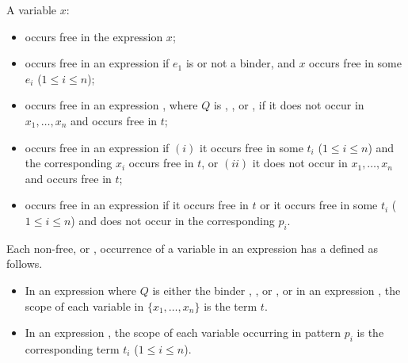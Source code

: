 \noindent A variable $x$:
\begin{itemize}
\item
occurs free in the expression $x$;
\item
occurs free in an expression 
if $e_1$ is  or not a binder, and 
$x$ occurs free in some $e_i$ ($1\le i\le n$); 
\item
occurs free in an expression 
,
where $Q$ is , , or ,
if it does not occur in $x_1, \ldots, x_n$ and occurs free in $t$;
\item
occurs free in an expression 
 if 
$(i)$ it occurs free in some $t_i$ ($1\le i\le n$) and 
the corresponding $x_i$ occurs free in $t$, or 
$(ii)$ it does not occur in $x_1, \ldots, x_n$ and occurs free in $t$;
\item
occurs free in an expression
if it occurs free in $t$ or it occurs free in some $t_i$ ($1\le i\le n$) and
does not occur in the corresponding $p_i$.
\end{itemize}


\noindent 
Each non-free, or , occurrence of a variable 
in an expression has a  defined as follows.

\begin{itemize}
\item
In an expression 
where $Q$ is either the binder , , or , 
or in an expression ,
the scope of each variable in $\{x_1, \ldots, x_n\}$ is the term $t$.
\item
In an expression 
,
the scope of each variable occurring in pattern $p_i$ is the corresponding term $t_i$
($1\le i\le n$).
\end{itemize}

